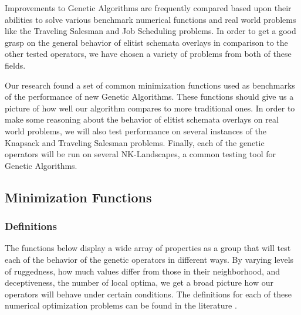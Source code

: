 Improvements to Genetic Algorithms are frequently compared based upon their abilities to solve various benchmark numerical functions and real world problems like the Traveling Salesman and Job Scheduling problems\cite{molga05}. In order to get a good grasp on the general behavior of elitist schemata overlays in comparison to the other tested operators, we have chosen a variety of problems from both of these fields. 

Our research found a set of common minimization functions used as benchmarks of the performance of new Genetic Algorithms\cite{Deb99,Eiben95,Tsutsui99}. These functions should give us a picture of how well our algorithm compares to more traditional ones. In order to make some reasoning about the behavior of elitist schemata overlays on real world problems, we will also test performance on several instances of the Knapsack and Traveling Salesman problems. Finally, each of the genetic operators will be run on several NK-Landscapes, a common testing tool for Genetic Algorithms.

\subsection*{Minimization Functions}
\subsubsection*{Definitions}

The functions below display a wide array of properties as a group that will test each of the behavior of the genetic operators in different ways. By varying levels of ruggedness, how much values differ from those in their neighborhood, and deceptiveness, the number of local optima, we get a broad picture how our operators will behave under certain conditions. The definitions for each of these numerical optimization problems can be found in the literature \cite{molga05,yang10}.

